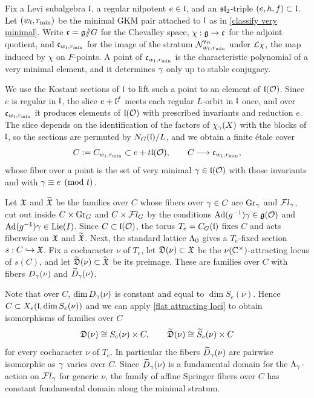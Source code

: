 \documentclass[11pt]{article}
\numberwithin{equation}{section}
\begin{document}
Fix a Levi subalgebra $\mathfrak{l}$, a regular nilpotent $e\in\mathfrak{l}$, and an $\mathfrak{sl}_2$-triple
$(e,h,f)\subset\mathfrak{l}$. Let $(w_{\mathfrak{l}},r_{\min})$ be the minimal GKM pair attached to
$\mathfrak{l}$ as in \cref{classify very minimal}. Write $\mathfrak{c}=\mathfrak{g}/\!\!/G$ for the Chevalley
space, $\chi:\mathfrak{g}\to\mathfrak{c}$ for the adjoint quotient, and $\mathfrak{c}_{w_{\mathfrak{l}},r_{\min}}$ for
the image of the stratum $\mathcal{N}^{tn}_{w_{\mathfrak{l}},r_{\min}}$ under $\mathcal{L}\chi$, the map induced by $\chi$ on $F$-points. A point of
$\mathfrak{c}_{w_{\mathfrak{l}},r_{\min}}$ is the characteristic polynomial of a very minimal
element, and it determines $\gamma$ only up to stable conjugacy.

We use the Kostant sections of $\mathfrak{l}$ to lift such a point to an element of
$\mathfrak{l}(\mathcal{O})$. Since $e$ is regular in $\mathfrak{l}$, the slice $e+\mathfrak{l}^f$ meets each regular
$L$-orbit in $\mathfrak{l}$ once, and over $\mathfrak{c}_{w_{\mathfrak{l}},r_{\min}}$ it produces elements of
$\mathfrak{l}(\mathcal{O})$ with prescribed invariants and reduction $e$. The slice depends on the
identification of the factors of $\chi_\gamma(X)$ with the blocks of $\mathfrak{l}$, so the
sections are permuted by $N_G(\mathfrak{l})/L$, and we obtain a finite \'etale cover
\[
C:=C_{w_{\mathfrak{l}},r_{\min}}\subset e+t\mathfrak{l}(\mathcal{O}),
\qquad
C\longrightarrow \mathfrak{c}_{w_{\mathfrak{l}},r_{\min}},
\]
whose fiber over a point is the set of very minimal $\gamma\in\mathfrak{l}(\mathcal{O})$ with those
invariants and with $\gamma\equiv e \pmod t$.

Let $\mathfrak{X}$ and $\widetilde{\mathfrak{X}}$ be the families over $C$ whose fibers over $\gamma\in C$
are $\operatorname{Gr}_\gamma$ and $\mathcal{F} l_\gamma$, cut out inside $C\times\operatorname{Gr}_G$ and
$C\times\mathcal{F} l_G$ by the conditions $\operatorname{Ad}(g^{-1})\gamma\in\mathfrak{g}(\mathcal{O})$ and
$\operatorname{Ad}(g^{-1})\gamma\in\operatorname{Lie}(I)$. Since $C\subset\mathfrak{l}(\mathcal{O})$, the torus $T_e=C_G(\mathfrak{l})$
fixes $C$ and acts fiberwise on $\mathfrak{X}$ and $\widetilde{\mathfrak{X}}$. Next, the standard lattice
$\Lambda_0$ gives a $T_e$-fixed section $s:C\hookrightarrow\mathfrak{X}$. Fix a cocharacter
$\nu$ of $T_e$, let $\mathfrak{D}(\nu)\subset\mathfrak{X}$ be the $\nu(\mathbb{C}^\times)$-attracting
locus of $s(C)$, and let $\widetilde{\mathfrak{D}}(\nu)\subset\widetilde{\mathfrak{X}}$ be its preimage.
These are families over $C$ with fibers $D_\gamma(\nu)$ and $\widetilde D_\gamma(\nu)$.

Note that over $C$, $\dim D_\gamma(\nu)$ is
constant and equal to $\dim S_e(\nu)$. Hence
$C\subset X_e(\mathfrak{l},\dim S_e(\nu))$ and  we can apply
\cref{flat attracting loci} to obtain isomorphisms of families over $C$
\[
\mathfrak{D}(\nu)\cong S_e(\nu)\times C,
\qquad
\widetilde{\mathfrak{D}}(\nu)\cong \widetilde S_e(\nu)\times C
\]
for every cocharacter $\nu$ of $T_e$. In particular the fibers
$\widetilde D_\gamma(\nu)$ are pairwise isomorphic as $\gamma$ varies over $C$. Since
$\widetilde D_\gamma(\nu)$ is a fundamental domain for the $\Lambda_\gamma$-action on
$\mathcal{F} l_\gamma$ for generic $\nu$, the family of affine Springer fibers over $C$ has
constant fundamental domain along the minimal stratum.
\end{document}
